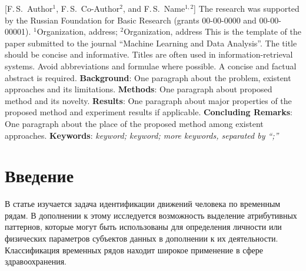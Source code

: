 \documentclass[12pt, twoside]{article}
\begin{document}
    [F.\,S.~Author$^1$, F.\,S.~Co-Author$^2$, and F.\,S.~Name$^{1, 2}$] %
\thanksEng
    {The research was
    	 supported by the Russian Foundation for Basic Research (grants 00-00-0000 and 00-00-00001).
    }
\organizationEng
    {$^1$Organization, address; $^2$Organization, address}
\abstractEng
    {This is the template of the paper submitted to the journal ``Machine Learning and Data Analysis''.	
	\noindent
	The title should be concise and informative. Titles are often used in information-retrieval systems. Avoid abbreviations and formulae where possible.
	\noindent
	A concise and factual abstract is required.
	\noindent
	\textbf{Background}: One paragraph about the problem, existent approaches and its limitations.
	\noindent
	\textbf{Methods}: One paragraph about proposed method and its novelty.
	\noindent
	\textbf{Results}: One paragraph about major properties of the proposed method and experiment results if applicable.
	\noindent
	\textbf{Concluding Remarks}: One paragraph about the place of the proposed method among existent approaches.	
	\noindent	
	\noindent
    	\textbf{Keywords}: \emph{keyword; keyword; more keywords, separated by ``;''}}


\maketitle
\linenumbers

\section{Введение}
В статье изучается задача идентификации движений человека по временным рядам. В дополнении к этому исследуется возможность выделение атрибутивных паттернов, которые могут быть использованы для определения личности или физических параметров субъектов данных в дополнении к их деятельности. Классификация временных рядов находит широкое применение в сфере здравоохранения.
\end{document}

